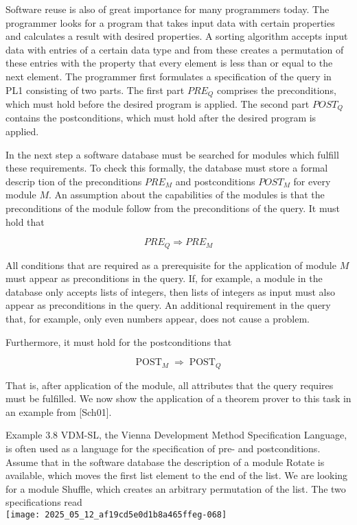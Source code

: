 \documentclass[10pt]{article}
\begin{document}
Software reuse is also of great importance for many programmers today. The programmer looks for a program that takes input data with certain properties and calculates a result with desired properties. A sorting algorithm accepts input data with entries of a certain data type and from these creates a permutation of these entries with the property that every element is less than or equal to the next element. The programmer first formulates a specification of the query in PL1 consisting of two parts. The first part $P R E_{Q}$ comprises the preconditions, which must hold before the desired program is applied. The second part $P O S T_{Q}$ contains the postconditions, which must hold after the desired program is applied.

In the next step a software database must be searched for modules which fulfill these requirements. To check this formally, the database must store a formal descrip
tion of the preconditions $P R E_{M}$ and postconditions $P O S T_{M}$ for every module $M$. An assumption about the capabilities of the modules is that the preconditions of the module follow from the preconditions of the query. It must hold that

$$
P R E_{Q} \Rightarrow P R E_{M}
$$

All conditions that are required as a prerequisite for the application of module $M$ must appear as preconditions in the query. If, for example, a module in the database only accepts lists of integers, then lists of integers as input must also appear as preconditions in the query. An additional requirement in the query that, for example, only even numbers appear, does not cause a problem.

Furthermore, it must hold for the postconditions that

$$
\operatorname{POST}_{M} \Rightarrow \operatorname{POST}_{Q}
$$

That is, after application of the module, all attributes that the query requires must be fulfilled. We now show the application of a theorem prover to this task in an example from [Sch01].

Example 3.8 VDM-SL, the Vienna Development Method Specification Language, is often used as a language for the specification of pre- and postconditions. Assume that in the software database the description of a module Rotate is available, which moves the first list element to the end of the list. We are looking for a module Shuffle, which creates an arbitrary permutation of the list. The two specifications read\\
\texttt{[image: 2025\_05\_12\_af19cd5e0d1b8a465ffeg-068]}
\end{document}
